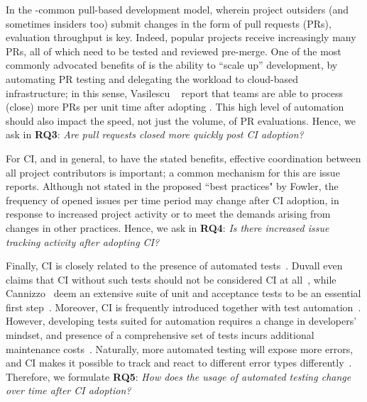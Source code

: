 In the \GH-common pull-based development model, wherein project outsiders 
(and sometimes insiders too) submit changes in the form of pull requests (PRs), 
evaluation throughput is key.
Indeed, popular \GH projects receive increasingly many PRs, all of which need 
to be tested and reviewed pre-merge.
One of the most commonly advocated benefits of \Tvis is the ability to ``scale up'' 
development, by automating PR testing and delegating the workload to cloud-based
infrastructure; in this sense, Vasilescu \etal~\cite{VasilescuYWDF15} report that 
\GH teams are able to process (\ie close) more PRs per unit time after adopting \Tvis.
This high level of automation should also impact the speed, not just the volume, of
PR evaluations.
Hence, we ask in \textbf{RQ3}: 
\emph{Are pull requests closed more quickly post CI adoption?}

For CI, and \DO in general, to have the stated benefits, effective coordination
between all project contributors is important; a common mechanism for this
are issue reports.
Although not stated in the proposed ``best practices" by Fowler, the frequency 
of opened issues per time period may change after CI adoption, in response to
increased project activity or to meet the demands arising from changes in 
other practices. %
Hence, we ask in \textbf{RQ4}: 
\emph{Is there increased issue tracking activity after adopting CI?}

Finally, CI is closely related to the presence of automated tests~\cite{Fowler}. 
Duvall even claims that CI without such tests should not be considered CI 
at all~\cite{Duvall}, while Cannizzo \etal~deem an extensive 
suite of unit and acceptance tests to be an essential first step~\cite{CannizzoCluttonRamesh}. 
Moreover, CI is frequently introduced together with test automation~\cite{Yuksel}.
However, developing tests suited for automation requires a change in developers' 
mindset, and presence of a comprehensive set of tests incurs additional maintenance 
costs~\cite{CoramBohner}.
Naturally, more automated testing will expose more errors, and CI makes it possible 
to track and react to different error types differently~\cite{BellerGZ16}.
Therefore, we formulate \textbf{RQ5}: 
\emph{How does the usage of automated testing change over time after CI adoption?} 

